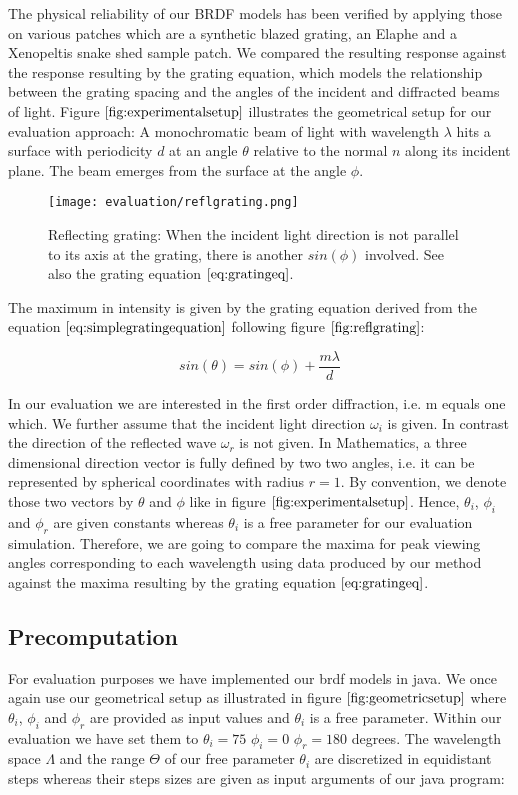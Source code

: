The physical reliability of our BRDF models has been verified by applying those on various patches which are a synthetic blazed grating, an Elaphe and a Xenopeltis snake shed sample patch. We compared the resulting response against the response resulting by the grating equation, which models the relationship between the grating spacing and the angles of the incident and diffracted beams of light. Figure $\ref{fig:experimentalsetup}$ illustrates the geometrical setup for our evaluation approach: A monochromatic beam of light with wavelength $\lambda$ hits a surface with periodicity $d$ at an angle $\theta$ relative to the normal $n$ along its incident plane. The beam emerges from the surface at the angle $\phi$. 

\begin{figure}[H]
  \centering
  \texttt{[image: evaluation/reflgrating.png]}
  \caption{Reflecting grating: When the incident light direction is not parallel to its axis at the grating, there is another $sin(\phi)$ involved. See also the grating equation $\ref{eq:gratingeq}$.}
  \label{fig:reflgrating}
\end{figure}

The maximum in intensity is given by the grating equation derived from the equation $\ref{eq:simplegratingequation}$ following figure $\ref{fig:reflgrating}$: 

\begin{equation}
  sin(\theta) = sin(\phi) + \frac{m \lambda}{d}
\label{eq:gratingeq}
\end{equation}

In our evaluation we are interested in the first order diffraction, i.e. m equals one which. We further assume that the incident light direction $\omega_i$ is given. In contrast the direction of the reflected wave $\omega_r$ is not given.
In Mathematics, a three dimensional direction vector is fully defined by two two angles, i.e. it can be represented by spherical coordinates with radius $r = 1$. By convention, we denote those two vectors by $\theta$ and $\phi$ like in figure $\ref{fig:experimentalsetup}$. Hence, $\theta_i$, $\phi_i$ and $\phi_r$ are given constants whereas $\theta_i$ is a free parameter for our evaluation simulation. Therefore, we are going to compare the maxima for peak viewing angles corresponding to each wavelength using data produced by our method against the maxima resulting by the grating equation $\ref{eq:gratingeq}$.

\subsection{Precomputation}
For evaluation purposes we have implemented our brdf models in java. We once again use our geometrical setup as illustrated in figure $\ref{fig:geometricsetup}$ where $\theta_i$, $\phi_i$ and $\phi_r$ are provided as input values and $\theta_i$ is a free parameter. Within our evaluation we have set them to $\theta_i = 75$ $\phi_i = 0$ $\phi_r = 180$ degrees. The wavelength space $\Lambda$ and the range $\Theta$ of our free parameter $\theta_i$ are discretized in equidistant steps whereas their steps sizes are given as input arguments of our java program:

